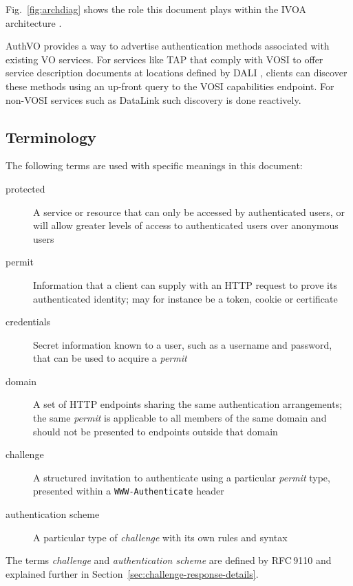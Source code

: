 \documentclass[11pt,a4paper]{ivoa}
\newcommand{\rfc}[1]{RFC\,#1}
\newcommand{\header}[1]{{\tt #1}}
\begin{document}
Fig.~\ref{fig:archdiag} shows the role this document plays within the
IVOA architecture \citep{2021ivoa.spec.1101D}.

AuthVO provides a way to advertise authentication methods
associated with existing VO services.
For services like TAP \citep{2019ivoa.spec.0927D}
that comply with VOSI \citep{2017ivoa.spec.0524G} to
offer service description documents at locations
defined by DALI \citep{2017ivoa.spec.0517D},
clients can discover these methods
using an up-front query to the VOSI capabilities endpoint.
For non-VOSI services such as DataLink \citep{2015ivoa.spec.0617D}
such discovery is done reactively.


\subsection{Terminology}

The following terms are used with specific meanings in this document:

\begin{description}
\item[protected]
      A service or resource that can only be accessed by authenticated users,
      or will allow greater levels of access to authenticated users over
      anonymous users
\item[permit]
      Information that a client can supply with an HTTP request to
      prove its authenticated identity;
      may for instance be a token, cookie or certificate
\item[credentials]
      Secret information known to a user, such as a username and password,
      that can be used to acquire a {\em permit}
\item[domain]
      A set of HTTP endpoints sharing the same authentication arrangements;
      the same {\em permit\/} is applicable to all members of the same domain
      and should not be presented to endpoints outside that domain
\item[challenge]
      A structured invitation to authenticate using
      a particular {\em permit\/} type,
      presented within a \header{WWW-Authenticate} header
\item[authentication scheme]
      A particular type of {\em challenge\/} with its own rules and syntax
\end{description}
The terms {\em challenge\/} and {\em authentication scheme} are
defined by \rfc{9110}
and explained further in Section~\ref{sec:challenge-response-details}.
\end{document}
